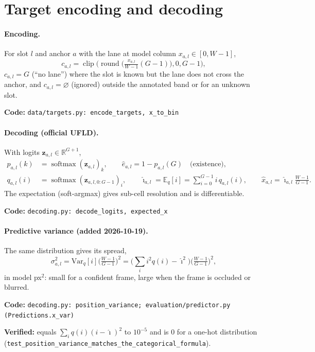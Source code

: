 \documentclass[10pt,a4paper]{article}
\newcommand{\code}[1]{\texttt{\small #1}}
\newcommand{\impl}[1]{\par\noindent\textcolor{blue!50!black}{\small\textbf{Code:} \texttt{#1}}\par}
\newcommand{\verif}[1]{\par\noindent\textcolor{green!35!black}{\small\textbf{Verified:} #1}\par}
\newcommand{\R}{\mathbb{R}}
\newcommand{\E}{\mathbb{E}}
\newcommand{\Var}{\mathrm{Var}}
\newcommand{\softmax}{\operatorname{softmax}}
\theoremstyle{definition}
\begin{document}
\section{Target encoding and decoding}
\paragraph{Encoding.} For slot $l$ and anchor $a$ with the lane at model column $x_{a,l}\in[0,W-1]$,
\begin{equation}
c_{a,l}=\operatorname{clip}\Big(\operatorname{round}\Big(\tfrac{x_{a,l}}{W-1}(G-1)\Big),0,G-1\Big),
\end{equation}
$c_{a,l}=G$ (``no lane'') where the slot is known but the lane does not cross the anchor, and
$c_{a,l}=\varnothing$ (ignored) outside the annotated band or for an unknown slot.
\impl{data/targets.py: encode\_targets, x\_to\_bin}

\paragraph{Decoding (official UFLD).} With logits $\bm z_{a,l}\in\R^{G+1}$,
\begin{align}
p_{a,l}(k)&=\softmax(\bm z_{a,l})_k,\qquad \hat e_{a,l}=1-p_{a,l}(G)\quad\text{(existence)},\\
q_{a,l}(i)&=\softmax(\bm z_{a,l,0:G-1})_i,\qquad
\hat\imath_{a,l}=\E_q[i]=\textstyle\sum_{i=0}^{G-1} i\,q_{a,l}(i),\qquad \hat x_{a,l}=\hat\imath_{a,l}\tfrac{W-1}{G-1}.
\end{align}
The expectation (soft-argmax) gives sub-cell resolution and is differentiable.
\impl{decoding.py: decode\_logits, expected\_x}

\paragraph{Predictive variance (added 2026-10-19).} The same distribution gives its spread,
\begin{equation}
\sigma^2_{a,l}=\Var_q[i]\Big(\tfrac{W-1}{G-1}\Big)^2=\Big(\textstyle\sum_i i^2q(i)-\hat\imath^2\Big)\Big(\tfrac{W-1}{G-1}\Big)^2,
\end{equation}
in model px$^2$: small for a confident frame, large when the frame is occluded or blurred.
\impl{decoding.py: position\_variance; evaluation/predictor.py (Predictions.x\_var)}
\verif{equals $\sum_i q(i)(i-\hat\imath)^2$ to $10^{-5}$ and is $0$ for a one-hot distribution
(\code{test\_position\_variance\_matches\_the\_categorical\_formula}).}
\end{document}
